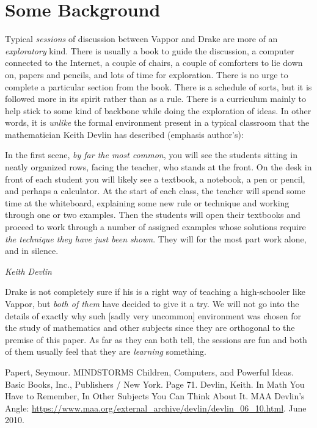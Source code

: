 \documentclass[a4paper]{article}
\begin{document}
\section{Some Background}
\label{sec: background}
Typical \emph{sessions} of discussion between Vappor and Drake are more of an \emph{exploratory} kind. There is usually a book to guide the discussion, a computer connected to the Internet, a couple of chairs, a couple of comforters to lie down on, papers and pencils, and lots of time for exploration. There is no urge to complete a particular section from the book. There is a schedule of sorts, but it is followed more in its spirit rather than as a rule. There is a curriculum mainly to help stick to some kind of backbone while doing the exploration of ideas. In other words, it is \emph{unlike} the formal environment present in a typical classroom that the mathematician Keith Devlin\cite{devlin} has described (emphasis author's):
\epigraph
{
    In the first scene, \emph{by far the most common}, you will see the students sitting in neatly organized rows, facing the teacher, who stands at the front. On the desk in front of each student you will likely see a textbook, a notebook, a pen or pencil, and perhaps a calculator. At the start of each class, the teacher will spend some time at the whiteboard, explaining some new rule or technique and working through one or two examples. Then the students will open their textbooks and proceed to work through a number of assigned examples whose solutions require \emph{the technique they have just been shown}. They will for the most part work alone, and in silence.
}
{\textit{Keith Devlin}}

Drake is not completely sure if his is a right way of teaching a high-schooler like Vappor, but \emph{both of them} have decided to give it a try. We will not go into the details of exactly why such [sadly very uncommon] environment was chosen for the study of mathematics and other subjects since they are orthogonal to the premise of this paper. As far as they can both tell, the sessions are fun and both of them usually feel that they are \emph{learning} something.
\begin{thebibliography}{00}
 Papert, Seymour. MINDSTORMS Children, Computers, and Powerful Ideas. Basic Books, Inc., Publishers / New York. Page 71.
 Devlin, Keith. In Math You Have to Remember, In Other Subjects You Can Think About It. MAA Devlin's Angle: \url{https://www.maa.org/external_archive/devlin/devlin_06_10.html}. June 2010.
\end{thebibliography}

% 
\end{document}
